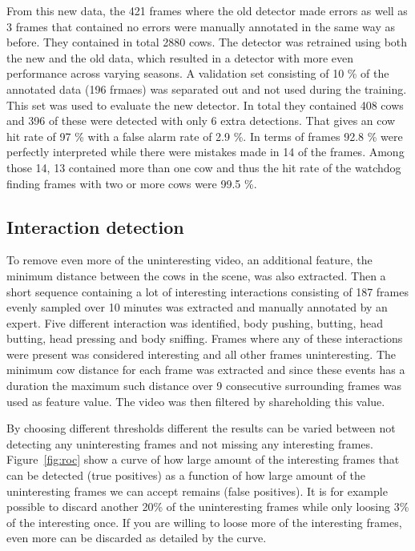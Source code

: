 \documentclass{IET}
\begin{document}
From this new data, the 421 frames where the old detector made errors as well as 3 frames that contained no errors were manually annotated in the same way as before. They contained in total 2880 cows. The detector was retrained using both the new and the old data, which resulted in a detector with more even performance across varying seasons. A validation set consisting of 10 \% of the annotated data (196 frmaes) was separated out and not used during the training. This set was used to evaluate the new detector. In total they contained 408 cows and 396 of these were detected with only 6 extra detections. That gives an cow hit rate of 97 \% with a false alarm rate of 2.9 \%. In terms of frames 92.8 \% were perfectly interpreted while there were mistakes made in 14 of the frames. Among those 14, 13 contained more than one cow and thus the hit rate of the watchdog finding frames with two or more cows were 99.5 \%.

\subsection{Interaction detection}
To remove even more of the uninteresting video, an additional feature, the minimum distance between the cows in the scene, was also extracted. Then a short sequence containing a lot of interesting interactions consisting of 187 frames evenly sampled over 10 minutes was extracted and manually annotated by an expert. Five different interaction was identified, body pushing, butting, head butting, head pressing and body sniffing. Frames where any of these interactions were present was considered interesting and all other frames uninteresting. The minimum cow distance for each frame was extracted and since these events has a duration the maximum such distance over 9 consecutive surrounding frames was used as feature value. The video was then filtered by shareholding this value. 

By choosing different thresholds different the results can be varied between not detecting any uninteresting frames and not missing any interesting frames. Figure~\ref{fig:roc} show a curve of how large amount of the interesting frames that can be detected (true positives) as a function of how large amount of the uninteresting frames we can accept remains (false positives). It is for example possible to discard another 20\% of the uninteresting frames while only loosing 3\% of the interesting once. If you are willing to loose more of the interesting frames, even more can be discarded as detailed by the curve.
\end{document}
